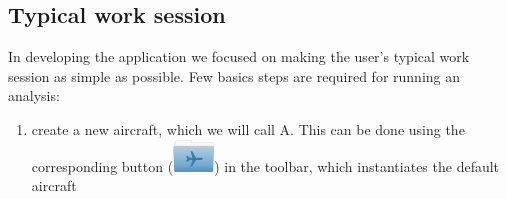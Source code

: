 \subsection{Typical work session}
In developing the application we focused on making the user's typical work session as simple as possible. Few basics steps are required for running an analysis:

\begin{enumerate}
\item create a new aircraft, which we will call A. This can be done using the corresponding button \big(\includegraphics[scale=0.6]{Immagini/gui/icons/FolderAirplane_32x32.png}\big) in the toolbar, which instantiates the default aircraft
	

\end{enumerate}

